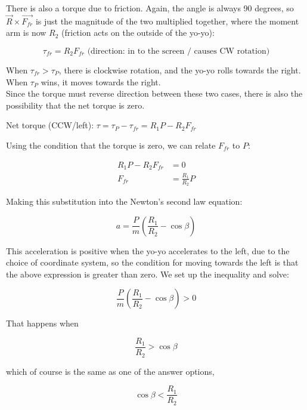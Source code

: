 \documentclass[12pt,a4paper]{report}
\begin{document}
There is also a torque due to friction. Again, the angle is always 90 degrees, so $\vec{R} \times \vec{F_{fr}}$ is just the magnitude of the two multiplied together, where the moment arm is now $R_2$ (friction acts on the outside of the yo-yo):

\begin{equation}
\tau_{fr} = R_2 F_{fr} \text{ (direction: in to the screen / causes CW rotation)}
\end{equation}

When $\tau_{fr} > \tau_P$, there is clockwise rotation, and the yo-yo rolls towards the right. When $\tau_P$ wins, it moves towards the right.\\
Since the torque must reverse direction between these two cases, there is also the possibility that the net torque is zero.

Net torque (CCW/left): $\tau = \tau_P - \tau_{fr} = R_1 P - R_2 F_{fr}$

Using the condition that the torque is zero, we can relate $F_{fr}$ to $P$:

\begin{align}
R_1 P - R_2 F_{fr} &= 0\\
F_{fr} &= \frac{R_1}{R_2} P
\end{align}

Making this substitution into the Newton's second law equation:

\begin{equation}
a = \frac{P}{m} \left(\frac{R_1}{R_2} - \cos \beta\right)
\end{equation}

This acceleration is positive when the yo-yo accelerates to the left, due to the choice of coordinate system, so the condition for moving towards the left is that the above expression is greater than zero. We set up the inequality and solve:

\begin{equation}
\frac{P}{m} \left(\frac{R_1}{R_2} - \cos \beta\right) > 0
\end{equation}

That happens when

\begin{equation}
\frac{R_1}{R_2} > \cos \beta
\end{equation}

which of course is the same as one of the answer options,

\begin{equation}
\cos \beta < \frac{R_1}{R_2}
\end{equation}
\end{document}
